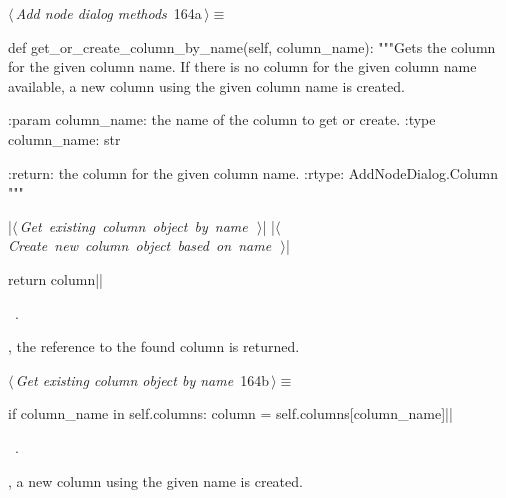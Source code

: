 \documentclass[%
    a4paper,    %
    justified,  %
    nobib,      %
    openany     %
]{tufte-book}
\makeatletter
\renewcommand{\label}[1]{\@tufte@label{##1}}%
\makeatother
\begin{document}
\begin{flushleft} \small
\begin{minipage}{\linewidth}\label{scrap157}\raggedright\small
{} $\langle\,${\itshape Add node dialog methods}\nobreak\ {\footnotesize {164a}}$\,\rangle\equiv$
\vspace{-1ex}
\begin{pythoncode}
def get_or_create_column_by_name(self, column_name):
    """Gets the column for the given column name.
    If there is no column for the given column name available, a new column
    using the given column name is created.

    :param column_name: the name of the column to get or create.
    :type  column_name: str

    :return: the column for the given column name.
    :rtype:  AddNodeDialog.Column
    """

    |\hbox{$\langle\,${\itshape Get existing column object by name}\nobreak\ {\footnotesize {}}$\,\rangle$}|
    |\hbox{$\langle\,${\itshape Create new column object based on name}\nobreak\ {\footnotesize {}}$\,\rangle$}|

    return column|\NWsep|
\end{pythoncode}
\vspace{1.5ex}
\footnotesize
\begin{list}{}{\setlength{\itemsep}{-\parsep}\setlength{\itemindent}{-\leftmargin}}
\item \NWtxtMacroRefIn\ .

\item{}
\end{list}
\end{minipage}\vspace{4ex}
\end{flushleft}
, the
reference to the found column is returned.

\begin{flushleft} \small
\begin{minipage}{\linewidth}\label{scrap158}\raggedright\small
{} $\langle\,${\itshape Get existing column object by name}\nobreak\ {\footnotesize {164b}}$\,\rangle\equiv$
\vspace{-1ex}
\begin{pythoncode}
if column_name in self.columns:
    column = self.columns[column_name]|\NWsep|
\end{pythoncode}
\vspace{1.5ex}
\footnotesize
\begin{list}{}{\setlength{\itemsep}{-\parsep}\setlength{\itemindent}{-\leftmargin}}
\item \NWtxtMacroRefIn\ .

\item{}
\end{list}
\end{minipage}\vspace{4ex}
\end{flushleft}
, a new column using the given
name is created.
\end{document}
